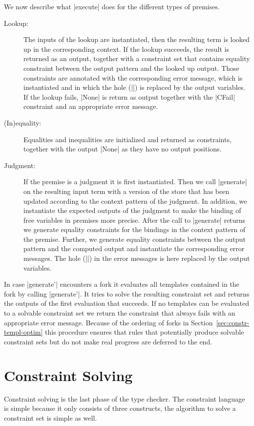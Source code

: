 We now describe what \code|execute| does for the different types of
premises.

\begin{description}
\item[Lookup:] The inputs of the lookup are instantiated, then the
  resulting term is looked up in the corresponding context. If the
  lookup succeeds, the result is returned as an output, together with a
  constraint set that contains equality constraint between the output
  pattern and the looked up output. Those constraints are annotated
  with the corresponding error message, which is instantiated and in
  which the hole (\code|{}|) is replaced by the output variables. If
  the lookup fails, \code|None| is return as output together with the
  \code|CFail| constraint and an appropriate error message.
\item[(In)equality:] Equalities and inequalities are initialized and
  returned as constraints, together with the output \code|None| as
  they have no output positions.
\item[Judgment:] If the premise is a judgment it is first
  instantiated. Then we call \code|generate| on the resulting input
  term with a version of the store that has been updated according to
  the context pattern of the judgment. In addition, we instantiate the
  expected outputs of the judgment to make the binding of free
  variables in premises more precise. After the call to
  \code|generate| returns we generate equality constraints for the
  bindings in the context pattern of the premise. Further, we generate
  equality constraints between the output pattern and the computed
  output and instantiate the corresponding error messages. The hole
  (\code|{}|) in the error messages is here replaced by the output
  variables.
\end{description}

In case \code|generate'| encounters a fork it evaluates all
templates contained in the fork by calling \code|generate'|. It tries
to solve the resulting constraint set and returns the outputs of the
first evaluation that succeeds. If no templates can be evaluated to a
solvable constraint set we return the constraint that always fails
with an appropriate error message. Because of the ordering of forks in
Section~\ref{sec:constr-templ-optim} this procedure ensures that rules
that potentially produce solvable constraint sets but do not make real
progress are deferred to the end.

\section{Constraint Solving}
\label{sec:constraint-solving}
Constraint solving is the last phase of the type checker. The
constraint language is simple because it only consists of three
constructs, the algorithm to solve a constraint set is simple as well.

